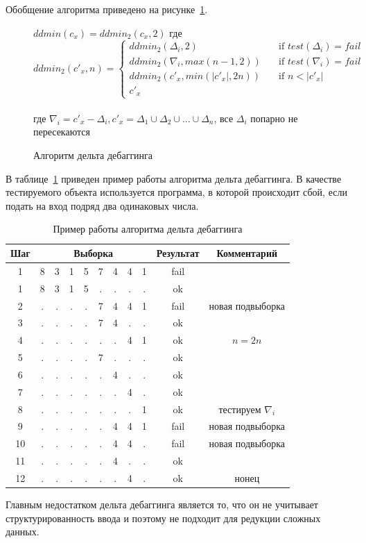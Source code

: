 Обобщение алгоритма приведено на рисунке~\ref{ddminalg}.
\begin{figure}
	$ddmin(c_x) = ddmin_2(c_x, 2)$ где \\
\[ ddmin_2(c'_x, n) =
  \begin{cases}
    ddmin_2(\Delta_i, 2)       & \quad \text{if } test(\Delta_i) = fail\\
    ddmin_2(\nabla_i, max(n - 1, 2))       & \quad \text{if } test(\nabla_i) = fail\\
    ddmin_2(c'_x, min(|c'_x|, 2n))       & \quad \text{if } n < |c'_x|\\
    c'_x
  \end{cases}
\]
\\
где $\nabla_i = c'_x - \Delta_i, c'_x = \Delta_1 \cup \Delta_2 \cup ... \cup \Delta_n$, все $\Delta_i$ попарно не пересекаются
\caption{Алгоритм дельта дебаггинга}
\label{ddminalg}
\end{figure}
В таблице~\ref{tab:ddminex2} приведен пример работы алгоритма дельта дебаггинга. В качестве тестируемого объекта используется программа, в которой происходит сбой, если подать на вход подряд два одинаковых числа.
\begin{table}[]
\center
\caption{\label{tab:ddminex2}Пример работы алгоритма дельта дебаггинга}
\begin{tabular}{| c | *{8}{c} | c | c |}
\hline
\bf Шаг & \multicolumn{8}{|c|}{\bf Выборка} & {\bf Результат} & {\bf Комментарий}\\
\hline
1 &  8 & 3 & 1 & 5 & 7 & 4 & 4 & 1  & fail & \\
\hline
1 &  8 & 3 & 1 & 5 & . & . & . & .  & ok & \\
\hline
2 &  . & . & . & . & 7 & 4 & 4 & 1 & fail & новая подвыборка\\
\hline
3 &  . & . & . & . & 7 & 4 & . & . & ok & \\
\hline
4 &  . & . & . & . & . & . & 4 & 1 & ok & $n = 2n$\\
\hline
5 &  . & . & . & . & 7 & . & . & . & ok & \\
\hline
6 &  . & . & . & . & . & 4 & . & . & ok &\\
\hline
7 &  . & . & . & . & . & . & 4 & . & ok &\\
\hline
8 &  . & . & . & . & . & . & . & 1 & ok &тестируем $\nabla_i$\\
\hline
9 &  . & . & . & . & . & 4 & 4 & 1 & fail &новая подвыборка\\
\hline
10 &  . & . & . & . & . & 4 & 4 & . & fail &новая подвыборка\\
\hline
11 &  . & . & . & . & . & 4 & . & . & ok &\\
\hline
12 &  . & . & . & . & . & . & 4 & . & ok & нонец\\
\hline
\end{tabular}
\end{table}
Главным недостатком дельта дебаггинга является то, что он не учитывает структурированность ввода и поэтому не подходит для редукции сложных данных.
